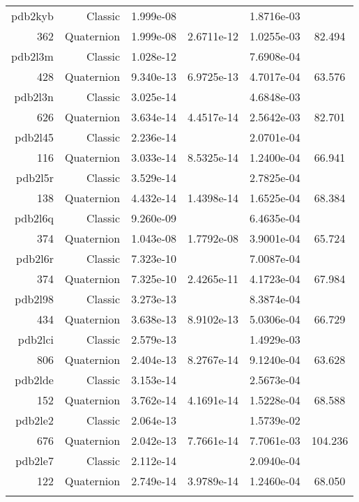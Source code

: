 \begin{xltabular}{\textwidth}{r|rS[table-format=1.3e+2]S[table-format=1.4e+2]S[table-format=1.4e+2]S[table-format=-1.3]}
pdb2kyb & Classic & 1.999e-08 &  & 1.8716e-03 & \\
362 & Quaternion & 1.999e-08 & 2.6711e-12 & 1.0255e-03 & 82.494\\  \addlinespace
pdb2l3m & Classic & 1.028e-12 &  & 7.6908e-04 & \\
428 & Quaternion & 9.340e-13 & 6.9725e-13 & 4.7017e-04 & 63.576\\  \addlinespace
pdb2l3n & Classic & 3.025e-14 &  & 4.6848e-03 & \\
626 & Quaternion & 3.634e-14 & 4.4517e-14 & 2.5642e-03 & 82.701\\  \addlinespace
pdb2l45 & Classic & 2.236e-14 &  & 2.0701e-04 & \\
116 & Quaternion & 3.033e-14 & 8.5325e-14 & 1.2400e-04 & 66.941\\  \addlinespace
pdb2l5r & Classic & 3.529e-14 &  & 2.7825e-04 & \\
138 & Quaternion & 4.432e-14 & 1.4398e-14 & 1.6525e-04 & 68.384\\  \addlinespace
pdb2l6q & Classic & 9.260e-09 &  & 6.4635e-04 & \\
374 & Quaternion & 1.043e-08 & 1.7792e-08 & 3.9001e-04 & 65.724\\  \addlinespace
pdb2l6r & Classic & 7.323e-10 &  & 7.0087e-04 & \\
374 & Quaternion & 7.325e-10 & 2.4265e-11 & 4.1723e-04 & 67.984\\  \addlinespace
pdb2l98 & Classic & 3.273e-13 &  & 8.3874e-04 & \\
434 & Quaternion & 3.638e-13 & 8.9102e-13 & 5.0306e-04 & 66.729\\  \addlinespace
pdb2lci & Classic & 2.579e-13 &  & 1.4929e-03 & \\
806 & Quaternion & 2.404e-13 & 8.2767e-14 & 9.1240e-04 & 63.628\\  \addlinespace
pdb2lde & Classic & 3.153e-14 &  & 2.5673e-04 & \\
152 & Quaternion & 3.762e-14 & 4.1691e-14 & 1.5228e-04 & 68.588\\  \addlinespace
pdb2le2 & Classic & 2.064e-13 &  & 1.5739e-02 & \\
676 & Quaternion & 2.042e-13 & 7.7661e-14 & 7.7061e-03 & 104.236\\  \addlinespace
pdb2le7 & Classic & 2.112e-14 &  & 2.0940e-04 & \\
122 & Quaternion & 2.749e-14 & 3.9789e-14 & 1.2460e-04 & 68.050\\  \addlinespace

\end{xltabular}
